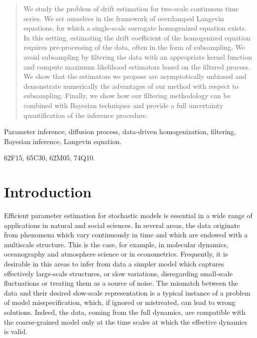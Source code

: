 \documentclass[review,onefignum,onetabnum]{siamonline190516}
\begin{document}
	
\maketitle	

\begin{abstract} We study the problem of drift estimation for two-scale continuous time series. We set ourselves in the framework of overdamped Langevin equations, for which a single-scale surrogate homogenized equation exists. In this setting, estimating the drift coefficient of the homogenized equation requires pre-processing of the data, often in the form of subsampling. We avoid subsampling by filtering the data with an appropriate kernel function and compute maximum likelihood estimators based on the filtered process. We show that the estimators we propose are asymptotically unbiased and demonstrate numerically the advantages of our method with respect to subsampling. Finally, we show how our filtering methodology can be combined with Bayesian techniques and provide a full uncertainty quantification of the inference procedure.
\end{abstract}
 
\begin{keywords} Parameter inference, diffusion process, data-driven homogenization, filtering, Bayesian inference, Langevin equation. 
\end{keywords}
\begin{AMS} 62F15, 65C30, 62M05, 74Q10. \end{AMS}

\section{Introduction}

Efficient parameter estimation for stochastic models is essential in a wide range of applications in natural and social sciences. In several areas, the data originate from phenomena which vary continuously in time and which are endowed with a multiscale structure. This is the case, for example, in molecular dynamics, oceanography and atmosphere science or in econometrics. Frequently, it is desirable in this areas to infer from data a simpler model which captures effectively large-scale structures, or slow variations, disregarding small-scale fluctuations or treating them as a source of noise. The mismatch between the data and their desired slow-scale representation is a typical instance of a problem of model misspecification, which, if ignored or mistreated, can lead to wrong solutions. Indeed, the data, coming from the full dynamics, are compatible with the coarse-grained model only at the time scales at which the effective dynamics is valid.
\end{document}
